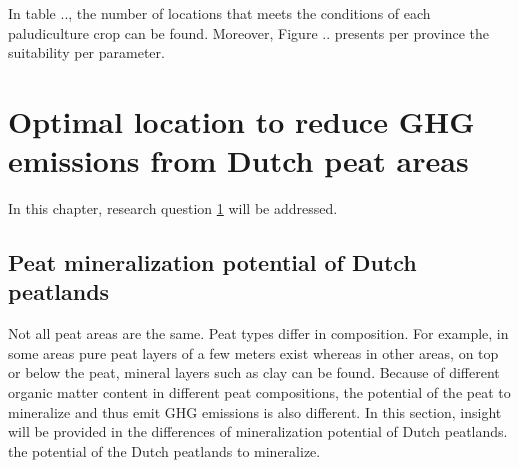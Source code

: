 {In table .., the number of locations that meets the conditions of each paludiculture crop can be found. Moreover, Figure .. presents per province the suitability per parameter. 


\chapter{Optimal location to reduce GHG emissions from Dutch peat areas} \label{ch:optloc}

In this chapter, research question \ref{ch:optloc} will be addressed.

\section{Peat mineralization potential of Dutch peatlands}

Not all peat areas are the same. Peat types differ in composition. For example, in some areas pure peat layers of a few meters exist whereas in other areas, on top or below the peat, mineral layers such as clay can be found. Because of different organic matter content in different peat compositions, the potential of the peat to mineralize and thus emit GHG emissions is also different. In this section, insight will be provided in the differences of mineralization potential of Dutch peatlands. the potential of the Dutch peatlands to mineralize. 

}
